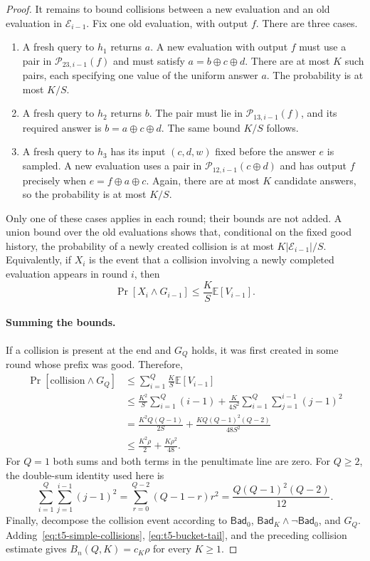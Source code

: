 \documentclass[11pt,letterpaper]{article}
\theoremstyle{definition} %
\begin{document}
\begin{proof}
It remains to bound collisions between a new evaluation and an old
evaluation in $\mathcal{E}_{i-1}$. Fix one old evaluation, with output
$f$. There are three cases.
\begin{enumerate}
 \item A fresh query to $h_1$ returns $a$. A new evaluation with output
 $f$ must use a pair in $\mathcal{P}_{23,i-1}(f)$ and must satisfy
 $a=b\oplus c\oplus d$. There are at most $K$ such pairs, each
 specifying one value of the uniform answer $a$. The probability is
 at most $K/S$.
 \item A fresh query to $h_2$ returns $b$. The pair must lie in
 $\mathcal{P}_{13,i-1}(f)$, and its required answer is
 $b=a\oplus c\oplus d$. The same bound $K/S$ follows.
 \item A fresh query to $h_3$ has its input $(c,d,w)$ fixed before
 the answer $e$ is sampled. A new evaluation uses a pair in
 $\mathcal{P}_{12,i-1}(c\oplus d)$ and has output $f$ precisely
 when $e=f\oplus a\oplus c$. Again, there are at most $K$
 candidate answers, so the probability is at most $K/S$.
\end{enumerate}
Only one of these cases applies in each round; their bounds are not
added. A union bound over the old evaluations shows that, conditional
on the fixed good history, the probability of a newly created collision
is at most $K|\mathcal{E}_{i-1}|/S$. Equivalently, if $X_i$ is the
event that a collision involving a newly completed evaluation appears
in round $i$, then
\begin{equation}
 \Pr[X_i\wedge G_{i-1}]
 \leq\frac{K}{S}\mathbb{E}[V_{i-1}].
 \label{eq:t5-per-query-collision}
\end{equation}

\paragraph{Summing the bounds.}
If a collision is present at the end and $G_Q$ holds, it was first
created in some round whose prefix was good. Therefore,
\begin{align*}
 \Pr[\text{collision}\wedge G_Q]
 &\leq\sum_{i=1}^{Q}\frac{K}{S}\mathbb{E}[V_{i-1}]\\
 &\leq\frac{K^2}{S}\sum_{i=1}^{Q}(i-1)
   +\frac{K}{4S^2}\sum_{i=1}^{Q}\sum_{j=1}^{i-1}(j-1)^2\\
 &=\frac{K^2Q(Q-1)}{2S}
   +\frac{KQ(Q-1)^2(Q-2)}{48S^2}\\
 &\leq\frac{K^2\rho}{2}+\frac{K\rho^2}{48}.
\end{align*}
For $Q=1$ both sums and both terms in the penultimate line are zero.
For $Q\geq2$, the double-sum identity used here is
\[
 \sum_{i=1}^{Q}\sum_{j=1}^{i-1}(j-1)^2
 =\sum_{r=0}^{Q-2}(Q-1-r)r^2
 =\frac{Q(Q-1)^2(Q-2)}{12}.
\]
Finally, decompose the collision event according to
$\mathsf{Bad}_0$, $\mathsf{Bad}_K\wedge\neg\mathsf{Bad}_0$, and
$G_Q$. Adding~\eqref{eq:t5-simple-collisions},
\eqref{eq:t5-bucket-tail}, and the preceding collision estimate gives
$B_n(Q,K)=c_K\rho$ for every $K\geq1$.


\end{proof}
\end{document}

